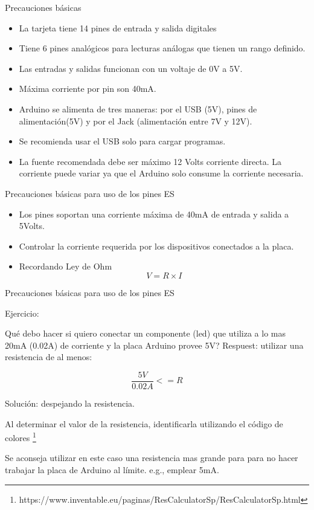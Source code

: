 \documentclass{beamer}
\begin{document}
\begin{frame}{Precauciones básicas}

\begin{itemize}
\item La tarjeta tiene 14 pines de entrada y salida digitales
\item Tiene 6 pines analógicos para lecturas análogas que tienen un rango definido.
\item Las entradas y salidas funcionan con un voltaje de 0V a 5V.
\item Máxima corriente por pin son 40mA.
\item Arduino se alimenta de tres maneras: por el USB (5V), pines de alimentación(5V) y por el Jack (alimentación entre 7V y 12V).
\item Se recomienda usar el USB solo para cargar programas. 
\item La fuente recomendada debe ser máximo 12 Volts corriente directa. La corriente puede variar ya que el Arduino solo consume la corriente necesaria.
\end{itemize}

\end{frame}


\begin{frame}{Precauciones básicas para uso de los pines E\/S}

\begin{itemize}
\item Los pines soportan una corriente máxima de 40mA de entrada y salida a 5Volts.
\item Controlar la corriente requerida por los dispositivos conectados a la placa. 
\item Recordando Ley de Ohm
$$V = R \times I$$
\end{itemize}


\end{frame}


\begin{frame}{Precauciones básicas para uso de los pines E\/S}

Ejercicio:

Qué debo hacer si quiero conectar un componente (led) que utiliza a lo mas 20mA (0.02A) de corriente y la placa Arduino provee 5V? Respuest: utilizar una resistencia de al menos:

$$\frac{5V}{0.02A} <= R $$

Solución: despejando la resistencia.

Al determinar el valor de la resistencia, identificarla utilizando el código de colores \footnote{https://www.inventable.eu/paginas/ResCalculatorSp/ResCalculatorSp.html}

Se aconseja utilizar en este caso una resistencia mas grande para para no hacer trabajar la placa de Arduino al límite. e.g., emplear 5mA.


\end{frame}
\end{document}
